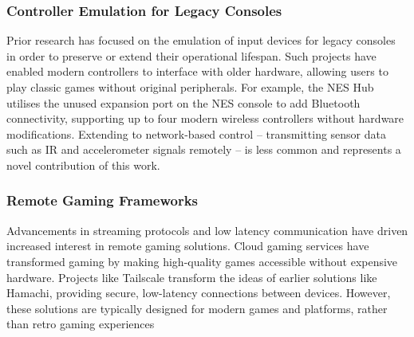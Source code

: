 \subsubsection{Controller Emulation for Legacy Consoles}
Prior research has focused on the emulation of input devices for legacy consoles in order to preserve or extend their operational lifespan. Such projects have enabled modern controllers to interface with older hardware, allowing users to play classic games without original peripherals. For example, the NES Hub utilises the unused expansion port on the NES console to add Bluetooth connectivity, supporting up to four modern wireless controllers without hardware modifications\cite{thevergeWirelessController}. Extending to network-based control -- transmitting sensor data such as IR and accelerometer signals remotely -- is less common and represents a novel contribution of this work.

\subsubsection{Remote Gaming Frameworks}
Advancements in streaming protocols and low latency communication have driven increased interest in remote gaming solutions. Cloud gaming services have transformed gaming by making high-quality games accessible without expensive hardware\cite{cloud_gaming}. Projects like Tailscale transform the ideas of earlier solutions like Hamachi, providing secure, low-latency connections between devices\cite{tailscaleTailscaleHamachi}. However, these solutions are typically designed for modern games and platforms, rather than retro gaming experiences
